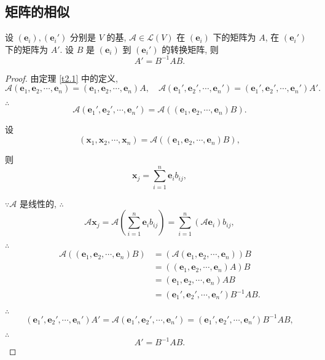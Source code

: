 \documentclass[color=black,device=normal,lang=cn,mode=geye]{elegantnote}
\begin{document}
\subsection{矩阵的相似}
\begin{theorem}[书上的定理 3]\label{t2.3}
    设 $(\boldsymbol{e}_i),(\boldsymbol{e}_i')$ 分别是 $V$ 的基, $\mathcal{A}\in\mathcal{L}(V)$ 在 $(\boldsymbol{e}_i)$ 下的矩阵为 $A$, 在 $(\boldsymbol{e}_i')$ 下的矩阵为 $A'$. 设 $B$ 是 $(\boldsymbol{e}_i)$ 到 $(\boldsymbol{e}_i')$ 的转换矩阵, 则
    \[A'=B^{-1}AB.\]
\end{theorem}
\begin{proof}
    由定理 \ref{t2.1} 中的定义,
    \[\mathcal{A}(\boldsymbol{e}_1,\boldsymbol{e}_2,\cdots,\boldsymbol{e}_n)=(\boldsymbol{e}_1,\boldsymbol{e}_2,\cdots,\boldsymbol{e}_n)A,\quad\mathcal{A}(\boldsymbol{e}_1',\boldsymbol{e}_2',\cdots,\boldsymbol{e}_n')=(\boldsymbol{e}_1',\boldsymbol{e}_2',\cdots,\boldsymbol{e}_n')A'.\]

    $\therefore$
    \[\mathcal{A}(\boldsymbol{e}_1',\boldsymbol{e}_2',\cdots,\boldsymbol{e}_n')=\mathcal{A}((\boldsymbol{e}_1,\boldsymbol{e}_2,\cdots,\boldsymbol{e}_n)B).\]

    设
    \[(\boldsymbol{x}_1,\boldsymbol{x}_2,\cdots,\boldsymbol{x}_n)=\mathcal{A}((\boldsymbol{e}_1,\boldsymbol{e}_2,\cdots,\boldsymbol{e}_n)B),\]

    则
    \[\boldsymbol{x}_j=\sum\limits_{i=1}^n\boldsymbol{e}_ib_{ij},\]

    $\because\mathcal{A}$ 是线性的, $\therefore$
    \[\mathcal{A}\boldsymbol{x}_j=\mathcal{A}\left(\sum\limits_{i=1}^n\boldsymbol{e}_ib_{ij}\right)=\sum\limits_{i=1}^n(\mathcal{A}\boldsymbol{e}_i)b_{ij},\]

    $\therefore$
    \begin{align*}
        \mathcal{A}((\boldsymbol{e}_1,\boldsymbol{e}_2,\cdots,\boldsymbol{e}_n)B) & =(\mathcal{A}(\boldsymbol{e}_1,\boldsymbol{e}_2,\cdots,\boldsymbol{e}_n))B \\
        & =((\boldsymbol{e}_1,\boldsymbol{e}_2,\cdots,\boldsymbol{e}_n)A)B \\
        & =(\boldsymbol{e}_1,\boldsymbol{e}_2,\cdots,\boldsymbol{e}_n)AB \\
        & =(\boldsymbol{e}_1',\boldsymbol{e}_2',\cdots,\boldsymbol{e}_n')B^{-1}AB.
    \end{align*}

    $\therefore$
    \[(\boldsymbol{e}_1',\boldsymbol{e}_2',\cdots,\boldsymbol{e}_n')A'=\mathcal{A}(\boldsymbol{e}_1',\boldsymbol{e}_2',\cdots,\boldsymbol{e}_n')=(\boldsymbol{e}_1',\boldsymbol{e}_2',\cdots,\boldsymbol{e}_n')B^{-1}AB,\]

    $\therefore$
    \[A'=B^{-1}AB.\]
\end{proof}
\end{document}
